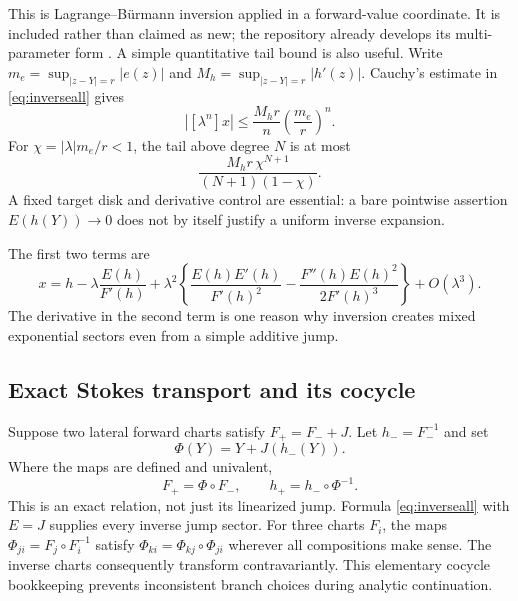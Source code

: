 \documentclass[11pt,a4paper]{article}
\numberwithin{equation}{section}
\theoremstyle{definition}
\theoremstyle{remark}
\begin{document}
This is Lagrange--B\"urmann inversion applied in a forward-value
coordinate. It is included rather than claimed as new; the repository
already develops its multi-parameter form \cite{repotransport}. A
simple quantitative tail bound is also useful. Write
$m_e=\sup_{|z-Y|=r}|e(z)|$ and
$M_h=\sup_{|z-Y|=r}|h'(z)|$. Cauchy's estimate in
\eqref{eq:inverseall} gives
\begin{equation}
 \left|[\lambda^n]x\right|\leq\frac{M_h r}{n}
                       \left(\frac{m_e}{r}\right)^n.
 \label{eq:coefbound}
\end{equation}
For $\chi=|\lambda|m_e/r<1$, the tail above degree $N$ is at most
\begin{equation}
 \frac{M_hr\,\chi^{N+1}}{(N+1)(1-\chi)}.
 \label{eq:tailbound}
\end{equation}
A fixed target disk and derivative control are essential: a bare
pointwise assertion $E(h(Y))\to0$ does not by itself justify a uniform
inverse expansion.

The first two terms are
\begin{equation}
 x=h-\lambda\frac{E(h)}{F'(h)}
 +\lambda^2\left\{\frac{E(h)E'(h)}{F'(h)^2}
                 -\frac{F''(h)E(h)^2}{2F'(h)^3}\right\}
 +O(\lambda^3).
 \label{eq:inverse2}
\end{equation}
The derivative in the second term is one reason why inversion creates
mixed exponential sectors even from a simple additive jump.

\subsection{Exact Stokes transport and its cocycle}
Suppose two lateral forward charts satisfy $F_+=F_-+J$. Let
$h_-=F_-^{-1}$ and set
\begin{equation}
 \Phi(Y)=Y+J(h_-(Y)).
 \label{eq:Phi}
\end{equation}
Where the maps are defined and univalent,
\begin{equation}
 F_+=\Phi\circ F_-,\qquad
 h_+=h_-\circ\Phi^{-1}.
 \label{eq:cocycle}
\end{equation}
This is an exact relation, not just its linearized jump. Formula
\eqref{eq:inverseall} with $E=J$ supplies every inverse jump sector.
For three charts $F_i$, the maps
$\Phi_{ji}=F_j\circ F_i^{-1}$ satisfy
$\Phi_{ki}=\Phi_{kj}\circ\Phi_{ji}$ wherever all compositions make
sense. The inverse charts consequently transform contravariantly.
This elementary cocycle bookkeeping prevents inconsistent branch
choices during analytic continuation.
\end{document}
